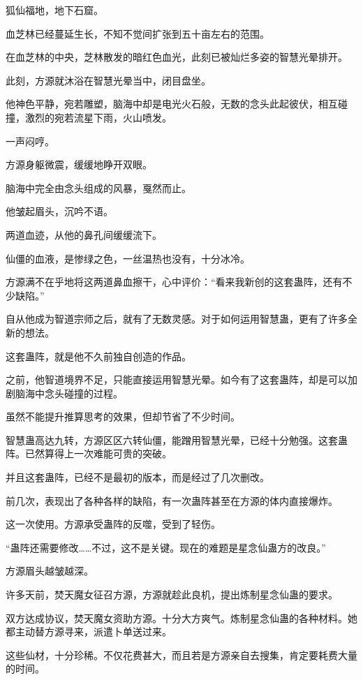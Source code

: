 
\begin{this_body}

狐仙福地，地下石窟。

血芝林已经蔓延生长，不知不觉间扩张到五十亩左右的范围。

在血芝林的中央，芝林散发的暗红色血光，此刻已被灿烂多姿的智慧光晕排开。

此刻，方源就沐浴在智慧光晕当中，闭目盘坐。

他神色平静，宛若雕塑，脑海中却是电光火石般，无数的念头此起彼伏，相互碰撞，激烈的宛若流星下雨，火山喷发。

一声闷哼。

方源身躯微震，缓缓地睁开双眼。

脑海中完全由念头组成的风暴，戛然而止。

他皱起眉头，沉吟不语。

两道血迹，从他的鼻孔间缓缓流下。

仙僵的血液，是惨绿之色，一丝温热也没有，十分冰冷。

方源满不在乎地将这两道鼻血擦干，心中评价：“看来我新创的这套蛊阵，还有不少缺陷。”

自从他成为智道宗师之后，就有了无数灵感。对于如何运用智慧蛊，更有了许多全新的想法。

这套蛊阵，就是他不久前独自创造的作品。

之前，他智道境界不足，只能直接运用智慧光晕。如今有了这套蛊阵，却是可以加剧脑海中念头碰撞的过程。

虽然不能提升推算思考的效果，但却节省了不少时间。

智慧蛊高达九转，方源区区六转仙僵，能蹭用智慧光晕，已经十分勉强。这套蛊阵。已然算得上一次难能可贵的突破。

并且这套蛊阵，已经不是最初的版本，而是经过了几次删改。

前几次，表现出了各种各样的缺陷，有一次蛊阵甚至在方源的体内直接爆炸。

这一次使用。方源承受蛊阵的反噬，受到了轻伤。

“蛊阵还需要修改……不过，这不是关键。现在的难题是星念仙蛊方的改良。”

方源眉头越皱越深。

许多天前，焚天魔女征召方源，方源就趁此良机，提出炼制星念仙蛊的要求。

双方达成协议，焚天魔女资助方源。十分大方爽气。炼制星念仙蛊的各种材料。她都主动替方源寻来，派遣卜单送过来。

这些仙材，十分珍稀。不仅花费甚大，而且若是方源亲自去搜集，肯定要耗费大量的时间。


\end{this_body}
